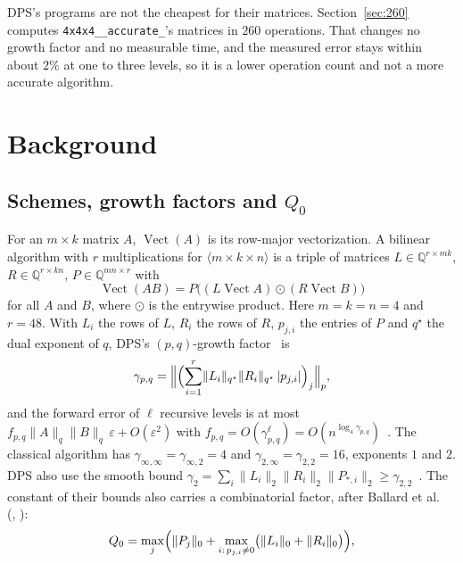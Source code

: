 \documentclass[11pt]{article}
\theoremstyle{remark}
\newcommand{\Q}{\mathbb{Q}}
\newcommand{\vect}{\operatorname{Vect}}
\newcommand{\nnz}[1]{\lVert #1\rVert_0}
\newcommand{\ginf}{\gamma_{\infty,2}}
\newcommand{\giinf}{\gamma_{\infty,\infty}}
\newcommand{\mm}[1]{\langle #1\rangle}
\newcommand{\acct}{\texttt{4x4x4\_\allowbreak 48\_\allowbreak accurate\_\allowbreak 262}\xspace}
\begin{document}
DPS's programs are not the cheapest for their matrices.
Section~\ref{sec:260} computes \acct's matrices in $260$ operations.
That changes no growth factor and no measurable time, and the measured
error stays within about $2\%$ at one to three levels, so it is a lower
operation count and not a more accurate algorithm.

\section{Background}\label{sec:background}

\subsection{Schemes, growth factors and $Q_0$}

For an $m\times k$ matrix $A$, $\vect(A)$ is its row-major
vectorization.  A bilinear algorithm with $r$ multiplications for
$\mm{m\times k\times n}$ is a triple of matrices $L\in\Q^{r\times mk}$,
$R\in\Q^{r\times kn}$, $P\in\Q^{mn\times r}$ with
\begin{equation}\label{eq:bilinear}
\vect(AB)=P\bigl((L\vect A)\odot(R\vect B)\bigr)
\end{equation}
for all $A$ and $B$, where $\odot$ is the entrywise product.  Here
$m=k=n=4$ and $r=48$.  With $L_i$ the rows of $L$, $R_i$ the rows of
$R$, $p_{j,i}$ the entries of $P$ and $q^\star$ the dual exponent of
$q$, DPS's $(p,q)$-growth factor~\cite[Def.~11]{DPS26b} is
\begin{equation}\label{eq:gamma}
\gamma_{p,q}=\Bigl\lVert\Bigl(\sum_{i=1}^{r}\lVert L_i\rVert_{q^\star}
\lVert R_i\rVert_{q^\star}\,\lvert p_{j,i}\rvert\Bigr)_{j}\Bigr\rVert_p ,
\end{equation}
and the forward error of $\ell$ recursive levels is at most
$f_{p,q}\lVert A\rVert_q\lVert B\rVert_q\,\varepsilon+O(\varepsilon^2)$
with $f_{p,q}=O(\gamma_{p,q}^{\ell})=O(n^{\log_4\gamma_{p,q}})$~\cite[Th.~18]{DPS26b}.  The
classical algorithm has $\giinf=\ginf=4$ and
$\gamma_{2,\infty}=\gamma_{2,2}=16$, exponents $1$ and $2$.  DPS also use the
smooth bound $\gamma_2=\sum_i\lVert L_i\rVert_2\lVert R_i\rVert_2
\lVert P_{*,i}\rVert_2\ge\gamma_{2,2}$~\cite[eq.~(5)]{DPS26a}.
The constant of their bounds also carries a combinatorial factor,
after Ballard et al.~\cite[Def.~1]{BBDLS16} (\cite[Th.~12]{DPS24},
\cite[Th.~18]{DPS26b}):
\begin{equation}\label{eq:q0}
Q_0=\max_j\Bigl(\nnz{P_j}+\max_{i:\,p_{j,i}\ne0}\bigl(\nnz{L_i}+\nnz{R_i}\bigr)\Bigr),
\end{equation}
\end{document}
